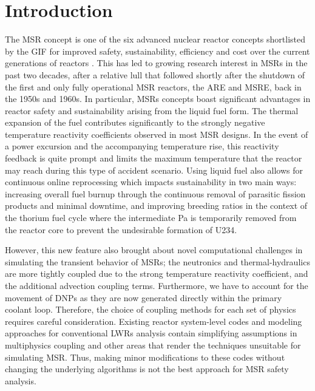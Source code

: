 \section{Introduction}

The \gls{MSR} concept is one of the six advanced nuclear reactor concepts
shortlisted by the \gls{GIF} for improved safety, sustainability, efficiency
and cost over the current generations of reactors
\cite{gif_technology_2002} \cite{gif_technology_2014}. This has led
to growing
research interest in \glspl{MSR} in the past two decades, after a relative
lull that followed shortly after the shutdown of the first and only fully
operational \gls{MSR} reactors, the \gls{ARE} and \gls{MSRE}, back in the
1950s and 1960s. In particular, \glspl{MSR} concepts boast significant
advantages in reactor safety and sustainability arising from the liquid fuel
form. The thermal expansion of the fuel contributes significantly to the
strongly negative temperature reactivity coefficients observed in most
\gls{MSR} designs. In the event of a power excursion and the accompanying
temperature rise, this reactivity feedback is quite prompt and limits the
maximum temperature that the reactor may reach during this type of accident
scenario. Using liquid fuel also allows for continuous online reprocessing
which impacts sustainability in two main ways: increasing overall fuel burnup
through the continuous removal of parasitic fission products and minimal
downtime, and improving breeding ratios in the context of the thorium fuel
cycle where the intermediate Pa is temporarily removed from the reactor core
to prevent the undesirable formation of U234.

However, this new feature also brought about novel computational
challenges in simulating the transient behavior of \glspl{MSR}; the
neutronics and thermal-hydraulics are more tightly coupled due to the strong
temperature reactivity coefficient, and the additional advection coupling
terms. Furthermore, we have to account for the movement of \glspl{DNP} as
they are now generated directly within the primary coolant loop. Therefore,
the choice of coupling methods for each set of physics requires careful
consideration. Existing reactor system-level codes and modeling approaches
for conventional \glspl{LWR} analysis contain simplifying assumptions in
multiphysics coupling and other areas that render the techniques unsuitable
for simulating \gls{MSR}. Thus, making minor modifications to these codes
without changing the underlying algorithms is not the best approach for
\gls{MSR} safety analysis.

